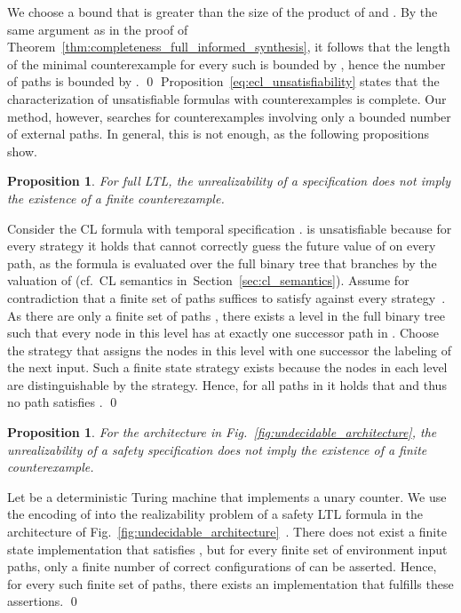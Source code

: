 \documentclass{LMCS}
\theoremstyle{plain}\newtheorem{theorem}[thm]{Theorem}
\theoremstyle{plain}\newtheorem{lemma}[thm]{Lemma}
\theoremstyle{plain}\newtheorem{proposition}[thm]{Proposition}
\theoremstyle{plain}\newtheorem{corollary}[thm]{Corollary}
\theoremstyle{definition}\newtheorem{definition}{Definition}[section]
\begin{document}
  We choose a bound  that is greater than the size of the product of  and .
  By the same argument as in the proof of Theorem~\ref{thm:completeness_full_informed_synthesis}, it follows that the length of the minimal counterexample for every such  is bounded by , hence the number of paths is bounded by .
\qed\noindent
Proposition~\ref{eq:ecl_unsatisfiability} states that the characterization of unsatisfiable formulas with counterexamples is complete.
Our method, however, searches for counterexamples involving only a bounded number of external paths. In general, this is not enough, as the following propositions show.\begin{proposition}
  For full LTL, the unrealizability of a specification does not imply the existence of a finite counterexample.
\end{proposition}
\proof
Consider the CL formula  with temporal specification .
 is unsatisfiable because for every strategy  it holds that  cannot correctly guess the future value of  on every path, as the formula is evaluated over the full binary tree that branches by the valuation of  (cf.\ CL semantics in~Section~\ref{sec:cl_semantics}).
Assume for contradiction that a finite set of paths  suffices to satisfy  against every strategy~.
As there are only a finite set of paths , there exists a level in the full binary tree such that every node in this level has at exactly one successor path in .
Choose the strategy  that assigns the nodes in this level with one successor the labeling of the next input.
Such a finite state strategy exists because the nodes in each level are distinguishable by the strategy.
Hence, for all paths in  it holds that  and thus no path satisfies .
\qed

\begin{proposition}
  For the architecture in Fig.~\ref{fig:undecidable_architecture}, the unrealizability of a safety specification does not imply the existence of a finite counterexample.
\end{proposition}
\proof
Let  be a deterministic Turing machine that implements a unary counter.
We use the encoding of  into the realizability problem of a safety LTL formula  in the architecture of Fig.~\ref{fig:undecidable_architecture}~\cite{DBLP:journals/ipl/Schewe14}.
There does not exist a finite state implementation that satisfies , but for every finite set of environment input paths, only a finite number of correct configurations of  can be asserted.
Hence, for every such finite set of paths, there exists an implementation that fulfills these assertions.
\qed
\end{document}
